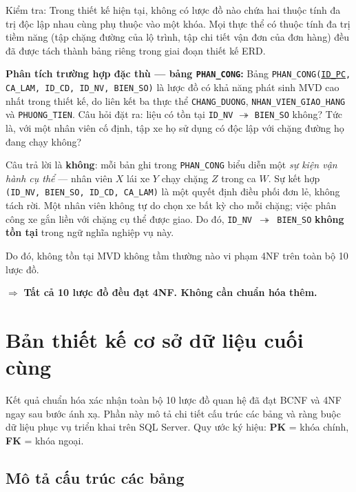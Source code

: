 \documentclass[11pt]{report}
\begin{document}
Kiểm tra: Trong thiết kế hiện tại, không có lược đồ nào chứa hai thuộc tính đa trị độc lập nhau cùng phụ thuộc vào một khóa. Mọi thực thể có thuộc tính đa trị tiềm năng (tập chặng đường của lộ trình, tập chi tiết vận đơn của đơn hàng) đều đã được tách thành bảng riêng trong giai đoạn thiết kế ERD.

\textbf{Phân tích trường hợp đặc thù --- bảng \texttt{PHAN\_CONG}:} Bảng \texttt{PHAN\_CONG(\underline{ID\_PC}, CA\_LAM, ID\_CD, ID\_NV, BIEN\_SO)} là lược đồ có khả năng phát sinh MVD cao nhất trong thiết kế, do liên kết ba thực thể \texttt{CHANG\_DUONG}, \texttt{NHAN\_VIEN\_GIAO\_HANG} và \texttt{PHUONG\_TIEN}. Câu hỏi đặt ra: liệu có tồn tại \texttt{ID\_NV} $\twoheadrightarrow$ \texttt{BIEN\_SO} không? Tức là, với một nhân viên cố định, tập xe họ sử dụng có độc lập với chặng đường họ đang chạy không?

Câu trả lời là \textbf{không}: mỗi bản ghi trong \texttt{PHAN\_CONG} biểu diễn một \textit{sự kiện vận hành cụ thể} --- nhân viên $X$ lái xe $Y$ chạy chặng $Z$ trong ca $W$. Sự kết hợp \texttt{(ID\_NV, BIEN\_SO, ID\_CD, CA\_LAM)} là một quyết định điều phối đơn lẻ, không tách rời. Một nhân viên không tự do chọn xe bất kỳ cho mỗi chặng; việc phân công xe gắn liền với chặng cụ thể được giao. Do đó, \texttt{ID\_NV $\twoheadrightarrow$ BIEN\_SO} \textbf{không tồn tại} trong ngữ nghĩa nghiệp vụ này.

Do đó, không tồn tại MVD không tầm thường nào vi phạm 4NF trên toàn bộ 10 lược đồ.

$\Rightarrow$ \textbf{Tất cả 10 lược đồ đều đạt 4NF. Không cần chuẩn hóa thêm.}

\section{Bản thiết kế cơ sở dữ liệu cuối cùng}
\label{sec:thietke_cuoi}

Kết quả chuẩn hóa xác nhận toàn bộ 10 lược đồ quan hệ đã đạt BCNF và 4NF ngay sau bước ánh xạ. Phần này mô tả chi tiết cấu trúc các bảng và ràng buộc dữ liệu phục vụ triển khai trên SQL Server. Quy ước ký hiệu: \textbf{PK} = khóa chính, \textbf{FK} = khóa ngoại.

\subsection{Mô tả cấu trúc các bảng}
\label{subsec:cau_truc_bang}
\end{document}
